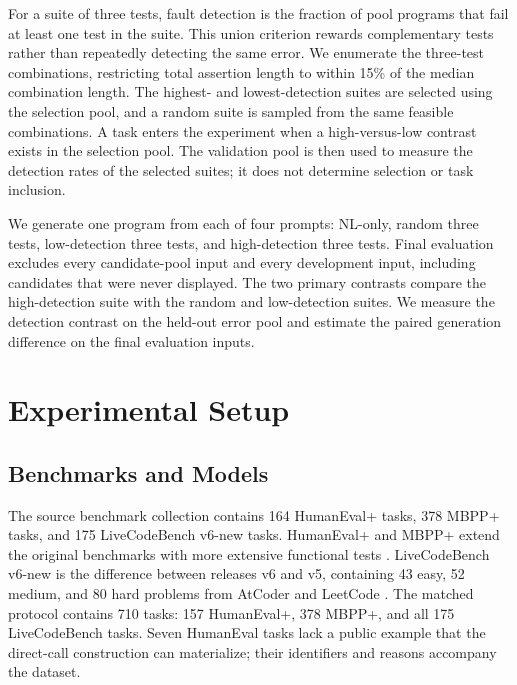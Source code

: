 \documentclass[acmsmall,screen,review,anonymous]{acmart}
\begin{document}
For a suite of three tests, fault detection is the fraction of pool programs that fail at least one test in the suite.
This union criterion rewards complementary tests rather than repeatedly detecting the same error.
We enumerate the three-test combinations, restricting total assertion length to within 15\% of the median combination length.
The highest- and lowest-detection suites are selected using the selection pool, and a random suite is sampled from the same feasible combinations.
A task enters the experiment when a high-versus-low contrast exists in the selection pool.
The validation pool is then used to measure the detection rates of the selected suites; it does not determine selection or task inclusion.

We generate one program from each of four prompts: NL-only, random three tests, low-detection three tests, and high-detection three tests.
Final evaluation excludes every candidate-pool input and every development input, including candidates that were never displayed.
The two primary contrasts compare the high-detection suite with the random and low-detection suites.
We measure the detection contrast on the held-out error pool and estimate the paired generation difference on the final evaluation inputs.

\section{Experimental Setup}

\subsection{Benchmarks and Models}

The source benchmark collection contains 164 HumanEval+ tasks, 378 MBPP+ tasks, and 175 LiveCodeBench v6-new tasks.
HumanEval+ and MBPP+ extend the original benchmarks with more extensive functional tests \citep{chen2021codex,austin2021mbpp,liu2023evalplus}.
LiveCodeBench v6-new is the difference between releases v6 and v5, containing 43 easy, 52 medium, and 80 hard problems from AtCoder and LeetCode \citep{jain2024livecodebench}.
The matched protocol contains 710 tasks: 157 HumanEval+, 378 MBPP+, and all 175 LiveCodeBench tasks.
Seven HumanEval tasks lack a public example that the direct-call construction can materialize; their identifiers and reasons accompany the dataset.
\end{document}
